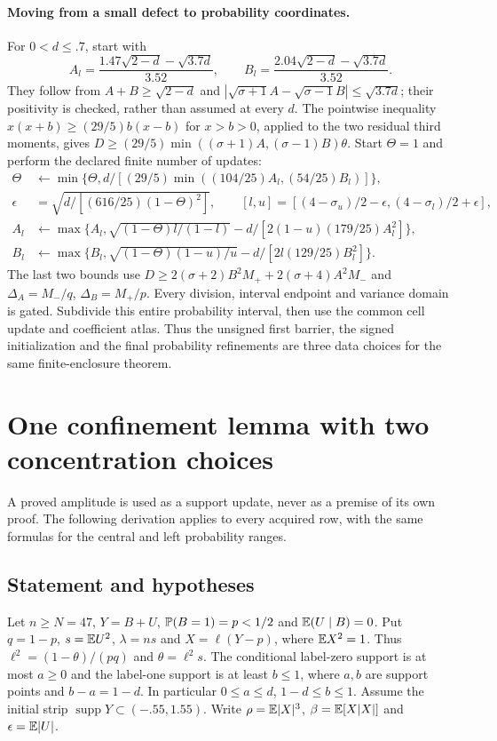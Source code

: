 \paragraph{Moving from a small defect to probability coordinates.}
For $0<d\le.7$, start with
\[
 A_l=\frac{1.47\sqrt{2-d}-\sqrt{3.7d}}{3.52},\qquad
 B_l=\frac{2.04\sqrt{2-d}-\sqrt{3.7d}}{3.52}.
\]
They follow from $A+B\ge\sqrt{2-d}$ and
$|\sqrt{\sigma+1}A-\sqrt{\sigma-1}B|\le\sqrt{3.7d}$;
their positivity is checked, rather than assumed at every $d$.
The pointwise inequality
$x(x+b)\ge(29/5)b(x-b)$ for $x>b>0$, applied to the two residual
third moments, gives
$D\ge(29/5)\min((\sigma+1)A,(\sigma-1)B)\theta$.
Start $\Theta=1$ and perform the declared finite number of updates:
\begin{align*}
 \Theta&\leftarrow\min\{\Theta,d/[(29/5)
                 \min((104/25)A_l,(54/25)B_l)]\},\\
 \epsilon&=\sqrt{d/[(616/25)(1-\Theta)^2]},\qquad
 [l,u]=[(4-\sigma_u)/2-\epsilon,(4-\sigma_l)/2+\epsilon],\\
 A_l&\leftarrow\max\{A_l,\sqrt{(1-\Theta)l/(1-l)}
                           -d/[2(1-u)(179/25)A_l^2]\},\\
 B_l&\leftarrow\max\{B_l,\sqrt{(1-\Theta)(1-u)/u}
                           -d/[2l(129/25)B_l^2]\}.
\end{align*}
The last two bounds use
$D\ge2(\sigma+2)B^2M_++2(\sigma+4)A^2M_-$ and
$\Delta_A=M_-/q$, $\Delta_B=M_+/p$.
Every division, interval endpoint and variance domain is gated.
Subdivide this entire probability interval, then use the common
cell update and coefficient atlas. Thus the unsigned first barrier,
the signed initialization and the final probability refinements are
three data choices for the same finite-enclosure theorem.

\section{One confinement lemma with two concentration choices}\label{conf:re:confinement}
A proved amplitude is used as a support update, never as a premise of
its own proof. The following derivation applies to every acquired row,
with the same formulas for the central and left probability ranges.
\subsection{Statement and hypotheses}
Let $n\ge N=47$, $Y=B+U$, $\mathbb P(B=1)=p<1/2$ and $\mathbb E(U\mid B)=0$.
Put $q=1-p$, $s=\mathbb E U^2$, $\lambda=ns$ and $X=\ell(Y-p)$, where
$\mathbb E X^2=1$. Thus $\ell^2=(1-\theta)/(pq)$ and $\theta=\ell^2s$.
The conditional label-zero support is at most $a\ge0$ and the label-one
support is at least $b\le1$, where $a,b$ are support points and
$b-a=1-d$. In particular $0\le a\le d$, $1-d\le b\le1$.
Assume the initial strip $\operatorname{supp}Y\subset(-.55,1.55)$.
Write $\rho=\mathbb E|X|^3$, $\beta=\mathbb E[X|X|]$ and $\epsilon=\mathbb E|U|$.

